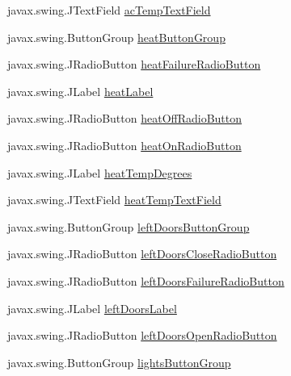 \begin{DoxyCompactItemize}
\item 
javax.\+swing.\+J\+Text\+Field \hyperlink{classTrainControllerComps_1_1TCUtilityPanel_a763accf7681a5b30439a892613b85d65}{ac\+Temp\+Text\+Field}
\item 
javax.\+swing.\+Button\+Group \hyperlink{classTrainControllerComps_1_1TCUtilityPanel_a9d0cedff49b91ba6eb55ba5d2008af3f}{heat\+Button\+Group}
\item 
javax.\+swing.\+J\+Radio\+Button \hyperlink{classTrainControllerComps_1_1TCUtilityPanel_a09070da2d6a0f1dc72df800e370d7ee5}{heat\+Failure\+Radio\+Button}
\item 
javax.\+swing.\+J\+Label \hyperlink{classTrainControllerComps_1_1TCUtilityPanel_a053a72d38a0b672de8420867e95932a1}{heat\+Label}
\item 
javax.\+swing.\+J\+Radio\+Button \hyperlink{classTrainControllerComps_1_1TCUtilityPanel_a2af78f1a19af2e4327699398c9e176d1}{heat\+Off\+Radio\+Button}
\item 
javax.\+swing.\+J\+Radio\+Button \hyperlink{classTrainControllerComps_1_1TCUtilityPanel_a10f7ec26815e66e82f3591c7a52b8ec6}{heat\+On\+Radio\+Button}
\item 
javax.\+swing.\+J\+Label \hyperlink{classTrainControllerComps_1_1TCUtilityPanel_af689686006aae65099d8858c649bc5b0}{heat\+Temp\+Degrees}
\item 
javax.\+swing.\+J\+Text\+Field \hyperlink{classTrainControllerComps_1_1TCUtilityPanel_a38b738786b933b92d370dd77eff1eb85}{heat\+Temp\+Text\+Field}
\item 
javax.\+swing.\+Button\+Group \hyperlink{classTrainControllerComps_1_1TCUtilityPanel_aff1c74f0d3b06ebaba7a3a9e36f57639}{left\+Doors\+Button\+Group}
\item 
javax.\+swing.\+J\+Radio\+Button \hyperlink{classTrainControllerComps_1_1TCUtilityPanel_a430c6f0b92c2d3cbb3f47c5f5e6d0e2b}{left\+Doors\+Close\+Radio\+Button}
\item 
javax.\+swing.\+J\+Radio\+Button \hyperlink{classTrainControllerComps_1_1TCUtilityPanel_adb4176436a78a952a899922da083b3f2}{left\+Doors\+Failure\+Radio\+Button}
\item 
javax.\+swing.\+J\+Label \hyperlink{classTrainControllerComps_1_1TCUtilityPanel_adf25afb4faad696a70d9f65705cb8227}{left\+Doors\+Label}
\item 
javax.\+swing.\+J\+Radio\+Button \hyperlink{classTrainControllerComps_1_1TCUtilityPanel_aa7543914175f059490e87332386cf7bb}{left\+Doors\+Open\+Radio\+Button}
\item 
javax.\+swing.\+Button\+Group \hyperlink{classTrainControllerComps_1_1TCUtilityPanel_a5ac14cc203c357c97e40e7c485946f37}{lights\+Button\+Group}

\end{DoxyCompactItemize}
